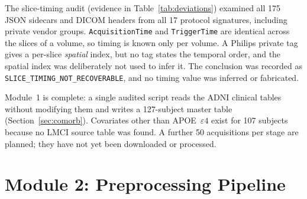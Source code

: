 \documentclass{ssnreview}
\begin{document}
The slice-timing audit (evidence in Table~\ref{tab:deviations}) examined all 175 JSON
sidecars and DICOM headers from all 17 protocol signatures, including private vendor
groups. \texttt{AcquisitionTime} and \texttt{TriggerTime} are identical across the slices
of a volume, so timing is known only per volume. A Philips private tag gives a per-slice
\emph{spatial} index, but no tag states the temporal order, and the spatial index was
deliberately not used to infer it. The conclusion was recorded as
\texttt{SLICE\_TIMING\_NOT\_RECOVERABLE}, and no timing value was inferred or fabricated.

Module~1 is complete: a single audited script reads the ADNI clinical tables without modifying
them and writes a 127-subject master table (Section~\ref{sec:comorb}). Covariates other than
APOE~$\varepsilon4$ exist for 107 subjects because no LMCI source table was found. A further 50 acquisitions per stage are planned; they have
not yet been downloaded or processed.

\section{Module 2: Preprocessing Pipeline}\label{sec:preproc}
\end{document}
